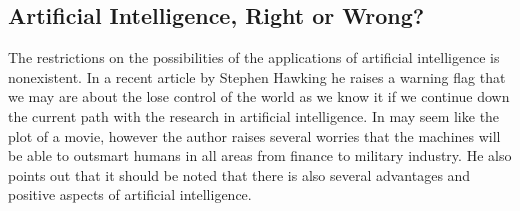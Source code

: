 \subsection{Artificial Intelligence, Right or Wrong? }
\label{sec:hawkins}
The restrictions on the possibilities of the applications of artificial intelligence is nonexistent. In a recent article by Stephen Hawking he raises a warning flag that we may are about the lose control of the world as we know it if we continue down the current path with the research in artificial intelligence. In may seem like the plot of a movie, however the author raises several worries that the machines will be able to outsmart humans in all areas from finance to military industry. He also points out that it should be noted that there is also several advantages and positive aspects of artificial intelligence. \parencite{Hawking:Online}





